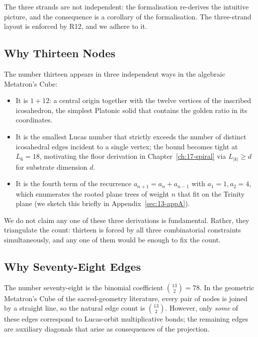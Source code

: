 The three strands are not independent: the formalisation re-derives
the intuitive picture, and the consequence is a corollary of the
formalisation. The three-strand layout is enforced by R12, and we
adhere to it.

\subsection{Why Thirteen Nodes}
\label{sec:13-thirteen}

The number thirteen appears in three independent ways in the
algebraic Metatron's Cube:

\begin{itemize}
\item It is $1 + 12$: a central origin together with the twelve
  vertices of the inscribed icosahedron, the simplest Platonic
  solid that contains the golden ratio in its coordinates.
\item It is the smallest Lucas number that strictly exceeds the
  number of distinct icosahedral edges incident to a single vertex;
  the bound becomes tight at $L_{6} = 18$, motivating the floor
  derivation in Chapter~\ref{ch:17-spiral} via $L_{|k|} \geq d$ for
  substrate dimension $d$.
\item It is the fourth term of the recurrence
  $a_{n+1} = a_{n} + a_{n-1}$ with $a_{1} = 1, a_{2} = 4$, which
  enumerates the rooted plane trees of weight $n$ that fit on the
  Trinity plane (we sketch this briefly in
  Appendix~\ref{sec:13-appA}).
\end{itemize}

We do not claim any one of these three derivations is fundamental.
Rather, they triangulate the count: thirteen is forced by all three
combinatorial constraints simultaneously, and any one of them would
be enough to fix the count.

\subsection{Why Seventy-Eight Edges}
\label{sec:13-seventy-eight}

The number seventy-eight is the binomial coefficient
$\binom{13}{2} = 78$. In the geometric Metatron's Cube of the
sacred-geometry literature, every pair of nodes is joined by a
straight line, so the natural edge count is $\binom{13}{2}$.
However, only \emph{some} of these edges correspond to Lucas-orbit
multiplicative bonds; the remaining edges are auxiliary diagonals
that arise as consequences of the projection.

